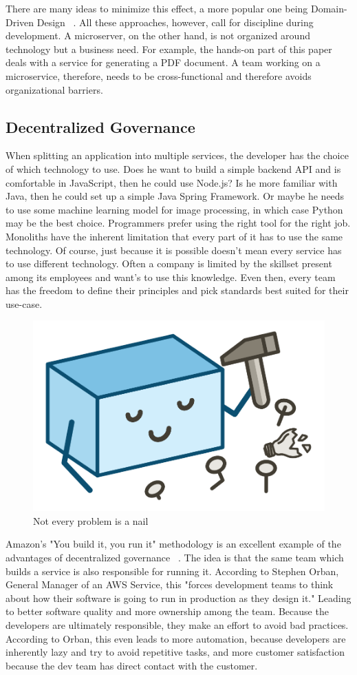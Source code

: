 There are many ideas to minimize this effect, a more popular one being Domain-Driven Design ~\cite{evans.2003}. All these approaches, however, call for discipline during development. A microserver, on the other hand, is not organized around technology but a business need. For example, the hands-on part of this paper deals with a service for generating a PDF document. A team working on a microservice, therefore, needs to be cross-functional and therefore avoids organizational barriers.


\subsection{Decentralized Governance}

When splitting an application into multiple services, the developer has the choice of which technology to use. Does he want to build a simple backend API and is comfortable in JavaScript, then he could use Node.js? Is he more familiar with Java, then he could set up a simple Java Spring Framework. Or maybe he needs to use some machine learning model for image processing, in which case Python may be the best choice. Programmers prefer using the right tool for the right job. Monoliths have the inherent limitation that every part of it has to use the same technology. Of course, just because it is possible doesn't mean every service has to use different technology. Often a company is limited by the skillset present among its employees and want's to use this knowledge. Even then, every team has the freedom to define their principles and pick standards best suited for their use-case.

\begin{figure}[ht]
  \centering
  \includegraphics[width=0.4\linewidth]{assets/illustration-monolith-hammer.png}
  \caption{Not every problem is a nail}
\end{figure}

Amazon's "You build it, you run it" methodology is an excellent example of the advantages of decentralized governance ~\cite{amazon.2015}. The idea is that the same team which builds a service is also responsible for running it. According to Stephen Orban, General Manager of an AWS Service, this "forces development teams to think about how their software is going to run in production as they design it." Leading to better software quality and more ownership among the team. Because the developers are ultimately responsible,  they make an effort to avoid bad practices. According to Orban, this even leads to more automation, because developers are inherently lazy and try to avoid repetitive tasks, and more customer satisfaction because the dev team has direct contact with the customer.


